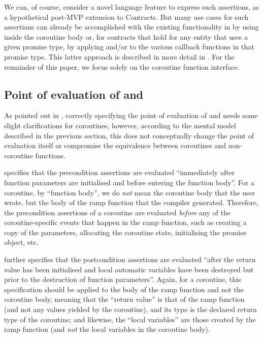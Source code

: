 We can, of course, consider a novel language feature to express such assertions, as a hypothetical post-MVP extension to Contracts. But many use cases for such assertions can already be accomplished with the existing functionality in \cite{P2900R8} by using  inside the coroutine body or, for contracts that hold for any entity that uses a given promise type, by applying  and/or  to the various callback functions in that promise type. This latter approach is described in more detail in \cite{P3251R0}. For the remainder of this paper, we focus solely on the coroutine function interface.

\subsection{Point of evaluation of  and }

As pointed out in \cite{P2957R1}, correctly specifying the point of evaluation of  and  needs some slight clarifications for coroutines, however, according to the mental model described in the previous section, this does not conceptually change the point of evaluation itself or compromise the equivalence between coroutines and non-coroutine functions.

\cite{P2900R8} specifies that the precondition assertions are evaluated ``immediately after function parameters are initialised and before entering the function body''. For a coroutine, by ``function body'', we do \emph{not} mean the coroutine body that the user wrote, but the body of the ramp function that the compiler generated. Therefore, the precondition assertions of a coroutine are evaluated \emph{before} any of the coroutine-specific events that happen in the ramp function, such as creating a copy of the parameters, allocating the coroutine state, initialising the promise object, etc.

\cite{P2900R8} further specifies that the postcondition assertions are evaluated ``after the return value has been initialised and local automatic variables have been destroyed but prior to the destruction of function parameters''. Again, for a coroutine, this specification should be applied to the body of the ramp function and not the coroutine body, meaning that the ``return value'' is that of the ramp function (and not any values yielded by the coroutine), and its type is the declared return type of the coroutine; and likewise, the ``local variables'' are those created by the ramp function (and \emph{not} the local variables in the coroutine body).

